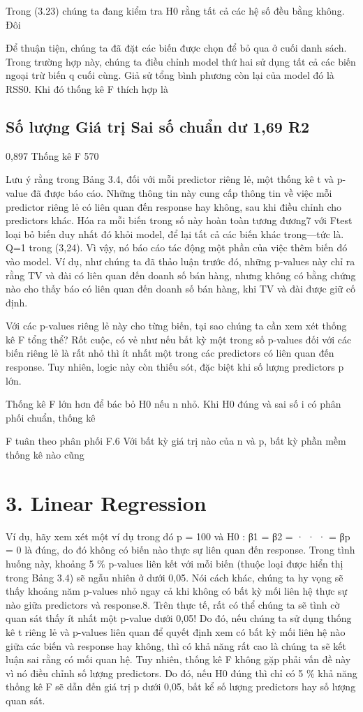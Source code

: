 Trong (3.23) chúng ta đang kiểm tra H0 rằng tất cả các hệ số đều bằng không. Đôi

Để thuận tiện, chúng ta đã đặt các biến được chọn để bỏ qua ở cuối danh sách. Trong trường hợp này, chúng ta điều chỉnh model thứ hai sử dụng tất cả các biến ngoại trừ biến q cuối cùng. Giả sử tổng bình phương còn lại của model đó là RSS0. Khi đó thống kê F thích hợp là

\subsection{Số lượng Giá trị Sai số chuẩn dư 1,69 R2}

0,897 Thống kê F 570

Lưu ý rằng trong Bảng 3.4, đối với mỗi predictor riêng lẻ, một thống kê t và p-value đã được báo cáo. Những thông tin này cung cấp thông tin về việc mỗi predictor riêng lẻ có liên quan đến response hay không, sau khi điều chỉnh cho predictors khác. Hóa ra mỗi biến trong số này hoàn toàn tương đương7 với Ftest loại bỏ biến duy nhất đó khỏi model, để lại tất cả các biến khác trong—tức là. Q=1 trong (3,24). Vì vậy, nó báo cáo tác động một phần của việc thêm biến đó vào model. Ví dụ, như chúng ta đã thảo luận trước đó, những p-values này chỉ ra rằng TV và đài có liên quan đến doanh số bán hàng, nhưng không có bằng chứng nào cho thấy báo có liên quan đến doanh số bán hàng, khi TV và đài được giữ cố định.

Với các p-values riêng lẻ này cho từng biến, tại sao chúng ta cần xem xét thống kê F tổng thể? Rốt cuộc, có vẻ như nếu bất kỳ một trong số p-values đối với các biến riêng lẻ là rất nhỏ thì ít nhất một trong các predictors có liên quan đến response. Tuy nhiên, logic này còn thiếu sót, đặc biệt khi số lượng predictors p lớn.

Thống kê F lớn hơn để bác bỏ H0 nếu n nhỏ. Khi H0 đúng và sai số i có phân phối chuẩn, thống kê

F tuân theo phân phối F.6 Với bất kỳ giá trị nào của n và p, bất kỳ phần mềm thống kê nào cũng

\section{3. Linear Regression}

Ví dụ, hãy xem xét một ví dụ trong đó p = 100 và H0 : β1 = β2 = · · · = βp = 0 là đúng, do đó không có biến nào thực sự liên quan đến response. Trong tình huống này, khoảng 5 \% p-values liên kết với mỗi biến (thuộc loại được hiển thị trong Bảng 3.4) sẽ ngẫu nhiên ở dưới 0,05. Nói cách khác, chúng ta hy vọng sẽ thấy khoảng năm p-values nhỏ ngay cả khi không có bất kỳ mối liên hệ thực sự nào giữa predictors và response.8. Trên thực tế, rất có thể chúng ta sẽ tình cờ quan sát thấy ít nhất một p-value dưới 0,05! Do đó, nếu chúng ta sử dụng thống kê t riêng lẻ và p-values liên quan để quyết định xem có bất kỳ mối liên hệ nào giữa các biến và response hay không, thì có khả năng rất cao là chúng ta sẽ kết luận sai rằng có mối quan hệ. Tuy nhiên, thống kê F không gặp phải vấn đề này vì nó điều chỉnh số lượng predictors. Do đó, nếu H0 đúng thì chỉ có 5 \% khả năng thống kê F sẽ dẫn đến giá trị p dưới 0,05, bất kể số lượng predictors hay số lượng quan sát.

